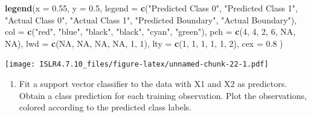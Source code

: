\documentclass[
]{article}
\newenvironment{Shaded}{\begin{snugshade}}{\end{snugshade}}
\newcommand{\AttributeTok}[1]{\textcolor[rgb]{0.13,0.29,0.53}{#1}}
\newcommand{\ConstantTok}[1]{\textcolor[rgb]{0.56,0.35,0.01}{#1}}
\newcommand{\DecValTok}[1]{\textcolor[rgb]{0.00,0.00,0.81}{#1}}
\newcommand{\FloatTok}[1]{\textcolor[rgb]{0.00,0.00,0.81}{#1}}
\newcommand{\FunctionTok}[1]{\textcolor[rgb]{0.13,0.29,0.53}{\textbf{#1}}}
\newcommand{\NormalTok}[1]{#1}
\newcommand{\StringTok}[1]{\textcolor[rgb]{0.31,0.60,0.02}{#1}}
\providecommand{\tightlist}{%
  \setlength{\itemsep}{0pt}\setlength{\parskip}{0pt}}
\begin{document}
\begin{Shaded}
\begin{Highlighting}[]
\FunctionTok{legend}\NormalTok{(}\AttributeTok{x =} \FloatTok{0.55}\NormalTok{, }\AttributeTok{y =} \FloatTok{0.5}\NormalTok{, }
       \AttributeTok{legend =} \FunctionTok{c}\NormalTok{(}\StringTok{"Predicted Class 0"}\NormalTok{, }\StringTok{"Predicted Class 1"}\NormalTok{, }
                  \StringTok{"Actual Class 0"}\NormalTok{, }\StringTok{"Actual Class 1"}\NormalTok{, }\StringTok{"Predicted Boundary"}\NormalTok{, }\StringTok{"Actual Boundary"}\NormalTok{), }
       \AttributeTok{col =} \FunctionTok{c}\NormalTok{(}\StringTok{"red"}\NormalTok{, }\StringTok{"blue"}\NormalTok{, }\StringTok{"black"}\NormalTok{, }\StringTok{"black"}\NormalTok{, }\StringTok{"cyan"}\NormalTok{, }\StringTok{"green"}\NormalTok{), }
       \AttributeTok{pch =} \FunctionTok{c}\NormalTok{(}\DecValTok{4}\NormalTok{, }\DecValTok{4}\NormalTok{, }\DecValTok{2}\NormalTok{, }\DecValTok{6}\NormalTok{, }\ConstantTok{NA}\NormalTok{, }\ConstantTok{NA}\NormalTok{),}
       \AttributeTok{lwd =} \FunctionTok{c}\NormalTok{(}\ConstantTok{NA}\NormalTok{, }\ConstantTok{NA}\NormalTok{, }\ConstantTok{NA}\NormalTok{, }\ConstantTok{NA}\NormalTok{, }\DecValTok{1}\NormalTok{, }\DecValTok{1}\NormalTok{),}
       \AttributeTok{lty =} \FunctionTok{c}\NormalTok{(}\DecValTok{1}\NormalTok{, }\DecValTok{1}\NormalTok{, }\DecValTok{1}\NormalTok{, }\DecValTok{1}\NormalTok{, }\DecValTok{1}\NormalTok{, }\DecValTok{2}\NormalTok{),}
       \AttributeTok{cex =} \FloatTok{0.8}
\NormalTok{       )}
\end{Highlighting}
\end{Shaded}

\texttt{[image: ISLR4.7.10\_files/figure-latex/unnamed-chunk-22-1.pdf]}

\begin{enumerate}
\def\labelenumi{(\alph{enumi})}
\setcounter{enumi}{6}
\tightlist
\item
  Fit a support vector classifier to the data with X1 and X2 as
  predictors. Obtain a class prediction for each training observation.
  Plot the observations, colored according to the predicted class
  labels.
\end{enumerate}
\end{document}

